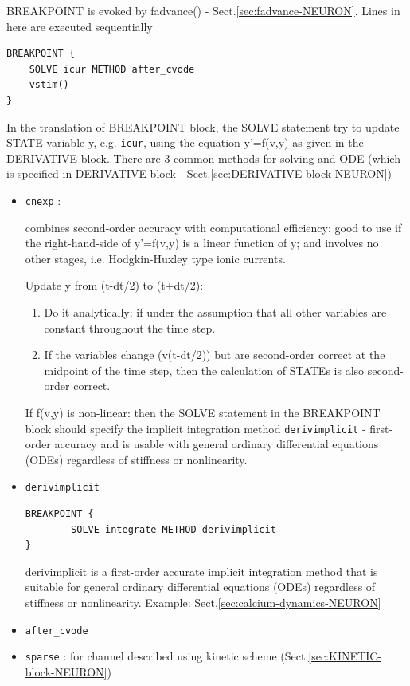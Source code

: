 BREAKPOINT is evoked by fadvance() - Sect.\ref{sec:fadvance-NEURON}.
Lines in here are executed sequentially
\begin{verbatim}
BREAKPOINT {
	SOLVE icur METHOD after_cvode
	vstim()
}
\end{verbatim}


In the translation of BREAKPOINT block, the SOLVE statement try to update 
STATE variable y, e.g. \verb!icur!, using the equation y'=f(v,y) as given in the
DERIVATIVE block. There are 3 common methods for solving and ODE (which is
specified in DERIVATIVE block - Sect.\ref{sec:DERIVATIVE-block-NEURON})
\begin{itemize}
  \item \verb!cnexp! :
  
  combines second-order accuracy with computational efficiency: good to use if
  the right-hand-side of y'=f(v,y) is a linear function of y; and involves no
  other stages, i.e. Hodgkin-Huxley type ionic currents.
  
  Update y from (t-dt/2) to (t+dt/2):
  \begin{enumerate}
    \item Do it analytically:  if under the assumption that all other
  variables are constant throughout the time step.
  
    \item   If the variables change (v(t-dt/2)) but are second-order correct at
    the midpoint of the time step, then the calculation of STATEs is also
    second-order correct.
    
    
  \end{enumerate}
   

If f(v,y) is non-linear: then the SOLVE statement in the BREAKPOINT block should
specify the implicit integration method \verb!derivimplicit! - first-order
accuracy and is usable with general ordinary
differential equations (ODEs) regardless of
stiffness or nonlinearity.
  
   \item \verb!derivimplicit!
\label{sec:derivimplicit-NEURON}
  
\begin{verbatim}
BREAKPOINT {
        SOLVE integrate METHOD derivimplicit
}
\end{verbatim}

derivimplicit is a first-order accurate implicit integration method that is
suitable for general ordinary differential equations (ODEs) regardless of
stiffness or nonlinearity.  Example: Sect.\ref{sec:calcium-dynamics-NEURON}
  
  \item \verb!after_cvode!
  \item \verb!sparse! : for channel described using kinetic scheme
  (Sect.\ref{sec:KINETIC-block-NEURON})
\end{itemize}



